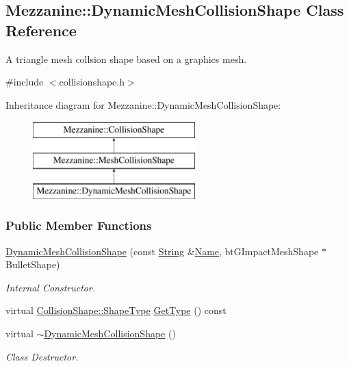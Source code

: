 \hypertarget{classMezzanine_1_1DynamicMeshCollisionShape}{
\subsection{Mezzanine::DynamicMeshCollisionShape Class Reference}
\label{classMezzanine_1_1DynamicMeshCollisionShape}
}


A triangle mesh collsion shape based on a graphics mesh.  




{\ttfamily \#include $<$collisionshape.h$>$}

Inheritance diagram for Mezzanine::DynamicMeshCollisionShape:\begin{figure}[H]
\begin{center}
\leavevmode
\includegraphics[height=3.000000cm]{classMezzanine_1_1DynamicMeshCollisionShape}
\end{center}
\end{figure}
\subsubsection*{Public Member Functions}
\begin{DoxyCompactItemize}
\item 
\hyperlink{classMezzanine_1_1DynamicMeshCollisionShape_a246dd3621bfd4e36ffd73cf3648dd7c5}{DynamicMeshCollisionShape} (const \hyperlink{namespaceMezzanine_acf9fcc130e6ebf08e3d8491aebcf1c86}{String} \&\hyperlink{classMezzanine_1_1CollisionShape_aac524c5c56fa4d158bc071f8aecfbe79}{Name}, btGImpactMeshShape $\ast$BulletShape)
\begin{DoxyCompactList}\small\item\em Internal Constructor. \item\end{DoxyCompactList}\item 
virtual \hyperlink{classMezzanine_1_1CollisionShape_ad04186055565998879b64176d6dd100d}{CollisionShape::ShapeType} \hyperlink{classMezzanine_1_1DynamicMeshCollisionShape_ae323a4ac9ae12890e1f8ce82b22f1ccc}{GetType} () const 
\item 
\hypertarget{classMezzanine_1_1DynamicMeshCollisionShape_a41204636fc0a0dba46fbc52c59cd08c6}{
virtual \hyperlink{classMezzanine_1_1DynamicMeshCollisionShape_a41204636fc0a0dba46fbc52c59cd08c6}{$\sim$DynamicMeshCollisionShape} ()}
\label{classMezzanine_1_1DynamicMeshCollisionShape_a41204636fc0a0dba46fbc52c59cd08c6}

\begin{DoxyCompactList}\small\item\em Class Destructor. \item\end{DoxyCompactList}\end{DoxyCompactItemize}
